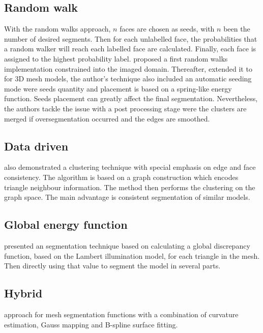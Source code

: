\subsection{Random walk}

With the random walks approach, $n$ faces are chosen as seeds, with $n$ been the number of desired segments.
Then for each unlabelled face, the probabilities that a random walker will reach each labelled face are calculated.
Finally, each face is assigned to the highest probability label.
\cite{Grady2006} proposed a first random walks implementation constrained into the imaged domain.
Thereafter, \cite{Lai2009} extended it to for 3D mesh models, the author's technique also included an automatic seeding mode were seeds quantity and placement is based on a spring-like energy function.
Seeds placement can greatly affect the final segmentation.
Nevertheless, the authors tackle the issue with a post processing stage were the clusters are merged if oversegmentation occurred and the edges are smoothed.
 

\subsection{Data driven}

\cite{Golovinskiy2009} also demonstrated a clustering technique with special emphasis on edge and face consistency.
The algorithm is based on a graph construction which encodes triangle neighbour information.
The method then performs the clustering on the graph space.
The main advantage is consistent segmentation of similar models.

\subsection{Global energy function}

\cite{DeCastro2014} presented an segmentation technique based on calculating a global discrepancy function, based on the Lambert illumination model, for each triangle in the mesh.
Then directly using that value to segment the model in several parts. 

\subsection{Hybrid}

\cite{Wang2011} approach for mesh segmentation functions with a combination of curvature estimation, Gauss mapping and B-spline surface fitting.


